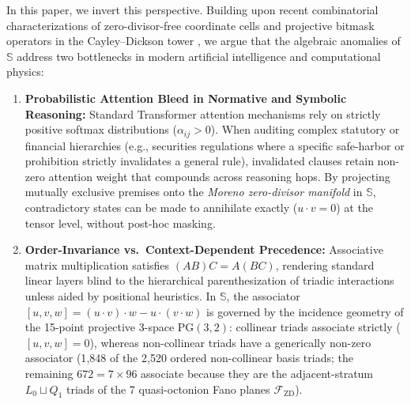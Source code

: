 \documentclass[11pt,a4paper]{article}
\theoremstyle{definition}
\theoremstyle{remark}
\newcommand{\Se}{\mathbb{S}}
\newcommand{\PG}{\mathrm{PG}}
\newcommand{\Fzd}{\mathcal{F}_{\mathrm{ZD}}}
\begin{document}
In this paper, we invert this perspective. Building upon recent combinatorial characterizations of zero-divisor-free coordinate cells and projective bitmask operators in the Cayley--Dickson tower \cite{Agourakis2026a,Agourakis2026b}, we argue that the algebraic anomalies of $\Se$ address two bottlenecks in modern artificial intelligence and computational physics:
\begin{enumerate}
    \item \textbf{Probabilistic Attention Bleed in Normative and Symbolic Reasoning:} Standard Transformer attention mechanisms rely on strictly positive softmax distributions ($\alpha_{ij} > 0$). When auditing complex statutory or financial hierarchies (e.g., securities regulations where a specific safe-harbor or prohibition strictly invalidates a general rule), invalidated clauses retain non-zero attention weight that compounds across reasoning hops. By projecting mutually exclusive premises onto the \textit{Moreno zero-divisor manifold} in $\Se$, contradictory states can be made to annihilate exactly ($u \cdot v = 0$) at the tensor level, without post-hoc masking.
    \item \textbf{Order-Invariance vs.\ Context-Dependent Precedence:} Associative matrix multiplication satisfies $(AB)C = A(BC)$, rendering standard linear layers blind to the hierarchical parenthesization of triadic interactions unless aided by positional heuristics. In $\Se$, the associator $[u, v, w] = (u \cdot v) \cdot w - u \cdot (v \cdot w)$ is governed by the incidence geometry of the 15-point projective 3-space $\PG(3,2)$: collinear triads associate strictly ($[u, v, w] = 0$), whereas non-collinear triads have a generically non-zero associator (1{,}848 of the 2{,}520 ordered non-collinear basis triads; the remaining $672 = 7 \times 96$ associate because they are the adjacent-stratum $L_0 \sqcup Q_1$ triads of the 7 quasi-octonion Fano planes $\Fzd$).
\end{enumerate}
\end{document}
